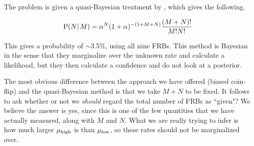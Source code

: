 \documentclass[useAMS,usenatbib]{mn2e}
\begin{document}
The problem is given a quasi-Bayesian treatment by
\cite{2014ApJ...789L..26P}, which gives the following.

\begin{equation}
\label{eq-petroff}
\textup{P}(N | \,M) =  \alpha^{N} (1 + \alpha)^{-(1+M+N)} \frac{(M+N)!}{M!N!}
\end{equation}

\noindent This gives a probability of $\sim$3.5$\%$, using all nine FRBs. This method 
is Bayesian in the sense that they marginalize over the unknown rate 
and calculate a likelihood, but they then calculate a confidence 
and do not look at a posterior.  






The most obvious difference between the approach we have offered (biased coin-flip) 
and the quasi-Bayesian method is that we take $M+N$ to be fixed. It follows to ask 
whether or not we \textit{should} regard the total number of FRBs as ``given"? 
We believe the answer is yes, since this is one of the few quantities that we 
have actually measured, along with $M$ and $N$. What we are really trying 
to infer is how much larger $\mu_{\textup{high}}$ is than $\mu_{\textup{low}}$, so these 
rates should not be marginalized over. 
\end{document}
